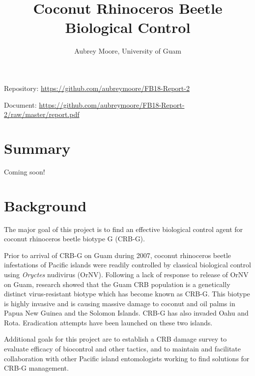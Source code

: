 \documentclass[12pt,letterpaper,english]{scrartcl}
\begin{document}
\titlehead{USDA APHIS Grant AP18PPQFO000C402\\
Progress Report 2\\
Report ID: AP18PPQFO000-PE-SA2-19\\
Performance Period: March 1, 2019 - August 31, 2019}
\title{Coconut Rhinoceros Beetle Biological Control}
\author{Aubrey Moore, University of Guam}
\maketitle

Repository: \url{https://github.com/aubreymoore/FB18-Report-2}

Document: \url{https://github.com/aubreymoore/FB18-Report-2/raw/master/report.pdf}

\newpage
\tableofcontents{}




\newpage
\section{Summary}

Coming soon!




\newpage
\section{Background}

The major goal of this project is to find an effective biological
control agent for coconut rhinoceros beetle biotype G (CRB-G). 

Prior to arrival of CRB-G on Guam during 2007, coconut rhinoceros beetle
infestations of Pacific islands were readily controlled by classical
biological control using \textit{Oryctes} nudivirus (OrNV). Following a lack
of response to release of OrNV on Guam, research showed that the Guam
CRB population is a genetically distinct virus-resistant biotype which
has become known as CRB-G\parencite{marshall_new_2017-1}. This biotype is highly invasive and is
causing massive damage to coconut and oil palms in Papua New Guinea
and the Solomon Islands. CRB-G has also invaded Oahu and Rota. Eradication
attempts have been launched on these two islands. 

Additional goals for this project are to establish a CRB damage survey to evaluate efficacy of biocontrol and other tactics, and to maintain and facilitate collaboration with other Pacific island entomologists working to find solutions for CRB-G management. 
\end{document}

